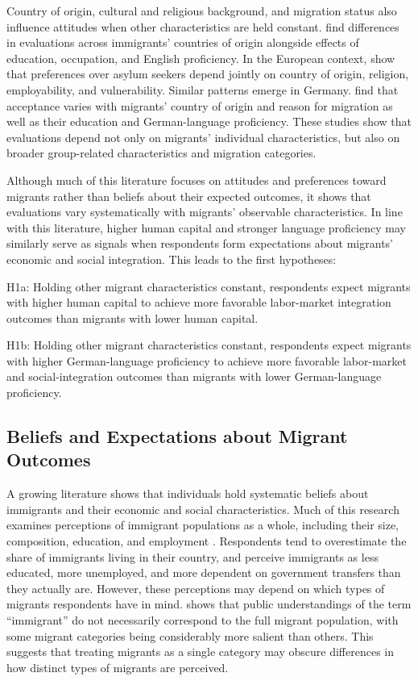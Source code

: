 Country of origin, cultural and religious 
background, and migration status also influence attitudes when other characteristics are held constant. 
\citet{hainmueller2015hidden} find differences in evaluations across immigrants' countries of origin alongside 
effects of education, occupation, and English proficiency. In the European context, \citet{bansak2016economic} show that 
preferences over asylum seekers depend jointly on country 
of origin, religion, employability, and vulnerability. Similar patterns emerge in 
Germany. \citet{czymara2016deutschland} find that acceptance varies with migrants' country of origin and reason for migration
 as well as their education and German-language proficiency. These studies show that evaluations depend not only 
on migrants’ individual characteristics, but also on broader group-related characteristics and migration categories.

Although much of this literature focuses on attitudes and preferences toward migrants rather than beliefs about their 
expected outcomes, it shows that evaluations vary systematically with migrants’ observable characteristics. 
In line with this literature, higher human capital and stronger language proficiency may similarly serve as signals when 
respondents form expectations about migrants’ economic and social integration. This leads to the first hypotheses: \bigskip

H1a: Holding other migrant characteristics constant, respondents expect migrants with higher human capital to achieve 
more favorable labor-market integration outcomes than migrants with lower human capital. \bigskip

H1b: Holding other migrant characteristics constant, respondents expect migrants with higher German-language 
proficiency to achieve more favorable labor-market and social-integration outcomes than migrants with lower 
German-language proficiency.

\subsection{Beliefs and Expectations about Migrant Outcomes}

A growing literature shows that individuals hold systematic beliefs about immigrants and their economic and 
social characteristics. Much of this research examines perceptions of immigrant populations as a whole, including 
their size, composition, education, and employment \citep{sides2007european, alesina2023immigration}. 
Respondents tend to overestimate the share of immigrants living in their country, and perceive immigrants 
as less educated, more unemployed, and more dependent on government transfers than they actually are. 
However, these perceptions may depend on which types of migrants respondents have in mind. \citet{blinder2015imagined} 
shows that public understandings of the term “immigrant” do not necessarily correspond to the full migrant 
population, with some migrant categories being considerably more salient than others. This suggests that treating 
migrants as a single category may obscure differences in how distinct types of migrants are perceived. 


